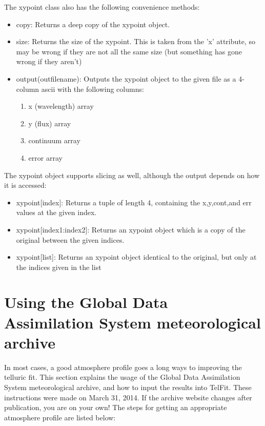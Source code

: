\documentclass{article}
\begin{document}
\begin{itemize}
The xypoint class also has the following convenience methods:
\begin{itemize}

  \item copy: Returns a deep copy of the xypoint object.
  \item size: Returns the size of the xypoint. This is taken from the 'x' attribute, so may be wrong if they are not all the same size (but something has gone wrong if they aren't)
  \item output(outfilename): Outputs the xypoint object to the given file as a 4-column ascii with the following columns:
  \begin{enumerate}
    \item x (wavelength) array
    \item y (flux) array
    \item continuum array
    \item error array
  \end{enumerate}
  
  
\end{itemize}
  
The xypoint object supports slicing as well, although the output depends on how it is accessed:
\begin{itemize}

  \item xypoint[index]: Returns a tuple of length 4, containing the x,y,cont,and err values at the given index.
  \item xypoint[index1:index2]: Returns an xypoint object which is a copy of the original between the given indices. 
  \item xypoint[list]: Returns an xypoint object identical to the original, but only at the indices given in the list

\end{itemize}




\end{itemize}



\appendix
\section{Using the Global Data Assimilation System meteorological archive}

\label{ap:gdas}

In most cases, a good atmosphere profile goes a long ways to improving the telluric fit. This section explains the usage of the Global Data Assimilation System meteorological archive, and how to input the results into TelFit. These instructions were made on March 31, 2014. If the archive website changes after publication, you are on your own! The steps for getting an appropriate atmosphere profile are listed below:
\end{document}

